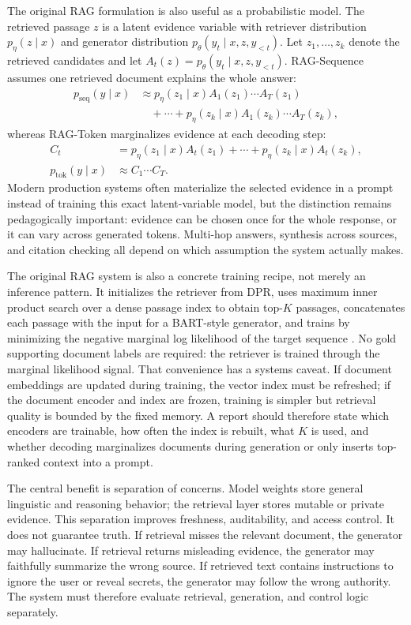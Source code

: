 The original RAG formulation is also useful as a probabilistic model. The retrieved passage $z$ is a latent evidence variable with retriever distribution $p_\eta(z\mid x)$ and generator distribution $p_\theta(y_t\mid x,z,y_{<t})$. Let $z_1,\ldots,z_k$ denote the retrieved candidates and let $A_t(z)=p_\theta(y_t\mid x,z,y_{<t})$. RAG-Sequence assumes one retrieved document explains the whole answer:
\[
  \begin{aligned}
  p_{\mathrm{seq}}(y\mid x)
  &\approx p_\eta(z_1\mid x)A_1(z_1)\cdots A_T(z_1) \\
  &\quad + \cdots
  + p_\eta(z_k\mid x)A_1(z_k)\cdots A_T(z_k),
  \end{aligned}
\]
whereas RAG-Token marginalizes evidence at each decoding step:
\[
  \begin{aligned}
  C_t
  &= p_\eta(z_1\mid x)A_t(z_1)+\cdots+p_\eta(z_k\mid x)A_t(z_k),\\
  p_{\mathrm{tok}}(y\mid x)
  &\approx C_1\cdots C_T.
  \end{aligned}
\]
Modern production systems often materialize the selected evidence in a prompt instead of training this exact latent-variable model, but the distinction remains pedagogically important: evidence can be chosen once for the whole response, or it can vary across generated tokens. Multi-hop answers, synthesis across sources, and citation checking all depend on which assumption the system actually makes.

The original RAG system is also a concrete training recipe, not merely an inference pattern. It initializes the retriever from DPR, uses maximum inner product search over a dense passage index to obtain top-$K$ passages, concatenates each passage with the input for a BART-style generator, and trains by minimizing the negative marginal log likelihood of the target sequence \cite{lewis2020retrieval,karpukhin2020dense}. No gold supporting document labels are required: the retriever is trained through the marginal likelihood signal. That convenience has a systems caveat. If document embeddings are updated during training, the vector index must be refreshed; if the document encoder and index are frozen, training is simpler but retrieval quality is bounded by the fixed memory. A report should therefore state which encoders are trainable, how often the index is rebuilt, what $K$ is used, and whether decoding marginalizes documents during generation or only inserts top-ranked context into a prompt.

The central benefit is separation of concerns. Model weights store general linguistic and reasoning behavior; the retrieval layer stores mutable or private evidence. This separation improves freshness, auditability, and access control. It does not guarantee truth. If retrieval misses the relevant document, the generator may hallucinate. If retrieval returns misleading evidence, the generator may faithfully summarize the wrong source. If retrieved text contains instructions to ignore the user or reveal secrets, the generator may follow the wrong authority. The system must therefore evaluate retrieval, generation, and control logic separately.

